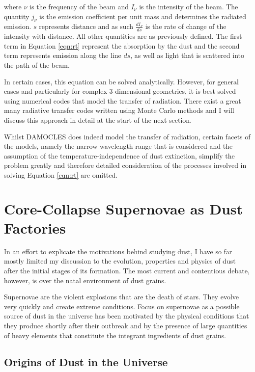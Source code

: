 \noindent where $\nu$ is the frequency of the beam and $I_{\nu}$ is the intensity of the beam.  The quantity $j_{\nu}$ is the emission coefficient per unit mass and determines the radiated emission.  $s$ represents distance and as such $\frac{dI_{\nu}}{ds}$ is the rate of change of the intensity with distance.  All other quantities are as previously defined.  The first term in Equation \ref{eqn:rt} represent the absorption by the dust and the second term represents emission along the line $ds$, as well as light that is scattered into the path of the beam.

In certain cases, this equation can be solved analytically.  However, for general cases and particularly for complex 3-dimensional geometries, it is best solved using numerical codes that model the transfer of radiation.  There exist a great many radiative transfer codes written using Monte Carlo methods and I will discuss this approach in detail at the start of the next section. 

Whilst DAMOCLES does indeed model the transfer of radiation, certain facets of the models, namely the narrow wavelength range that is considered and the assumption of the temperature-independence of dust extinction, simplify the problem greatly and therefore detailed consideration of the processes involved in solving Equation \ref{eqn:rt} are omitted.

\section{Core-Collapse Supernovae as Dust Factories}

In an effort to explicate the motivations behind studying dust, I have so far mostly limited my discussion to the evolution, properties and physics of dust after the initial stages of its formation.  The most current and contentious debate, however, is over the natal environment of dust grains.  

Supernovae are the violent explosions that are the death of stars.  They evolve very quickly and create extreme conditions.  Focus on supernovae as a possible source of dust in the universe has been motivated by the physical conditions that they produce shortly after their outbreak and by the presence of large quantities of heavy elements that constitute the integrant ingredients of dust grains.

\subsection{Origins of Dust in the Universe}

